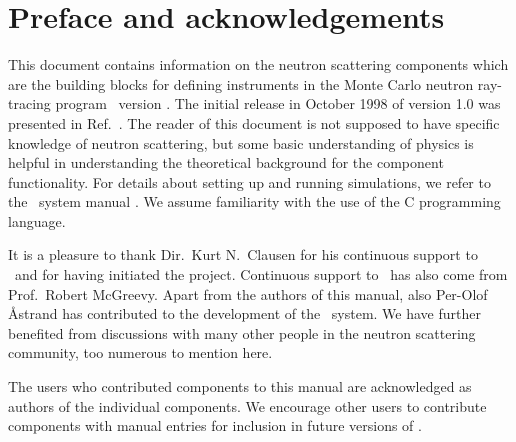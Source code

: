 
\chapter*{Preface and acknowledgements}
This document contains information on the neutron scattering components
which are the building blocks for defining instruments
in the Monte Carlo neutron
ray-tracing program \MCS\ version \version . The initial
release in October 1998 of version 1.0 was presented in Ref.~\cite{nn_10_20}.
The reader of this
document is not supposed to have specific knowledge of neutron scattering,
but some basic understanding of physics is helpful in
understanding the theoretical background for the component functionality.
For details about setting up and running simulations, we refer to
the \MCS\ system manual \cite{mcstasmanual}.
We assume familiarity with the use of
the C programming language.


It is a pleasure to thank Dir.~Kurt N.~Clausen for his continuous
support to \MCS\ and for having initiated the project.
Continuous support to \MCS\ has also come from Prof.~Robert McGreevy.
Apart from the authors of this manual, 
also Per-Olof \AA strand has contributed to the development of the \MCS\ system.
We have further benefited
from discussions with many other people in the neutron scattering
community, too numerous to mention here.

The users who contributed components to this manual are acknowledged
as authors of the individual components. We encourage other
users to contribute components with manual entries for inclusion in
future versions of \MCS.

